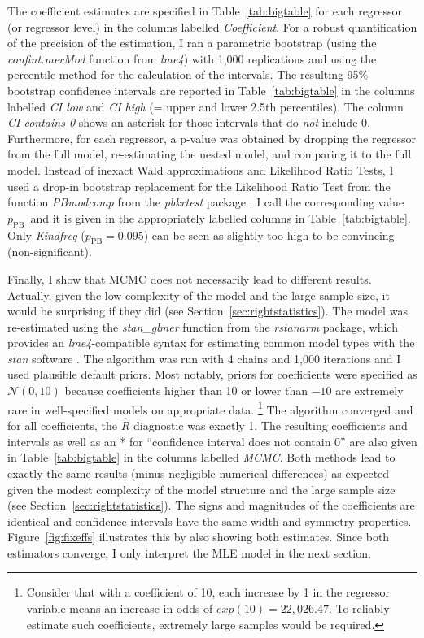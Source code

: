 \documentclass[USenglish]{article}
\newcommand{\mpPB}{\ensuremath{p_{\text{PB}}}}
\begin{document}
The coefficient estimates are specified in Table~\ref{tab:bigtable} for each regressor (or regressor level) in the columns labelled \textit{Coefficient}.
For a robust quantification of the precision of the estimation, I ran a parametric bootstrap (using the \mbox{\textit{confint.merMod}} function from \textit{lme4}) with 1,000 replications and using the percentile method for the calculation of the intervals.
The resulting 95\% bootstrap confidence intervals are reported in Table~\ref{tab:bigtable} in the columns labelled \textit{CI low} and \textit{CI high} (= upper and lower 2.5th percentiles).
The column \textit{CI contains 0} shows an asterisk for those intervals that do \textit{not} include 0.
Furthermore, for each regressor, a p-value was obtained by dropping the regressor from the full model, re-estimating the nested model, and comparing it to the full model.
Instead of inexact Wald approximations and Likelihood Ratio Tests, I used a drop-in bootstrap replacement for the Likelihood Ratio Test from the function \textit{PBmodcomp} from the \textit{pbkrtest} package \citep{HalekohHojsgaard2014}.
I call the corresponding value $p_{\text{PB}}$\ and it is given in the appropriately labelled columns in Table~\ref{tab:bigtable}.
Only \textit{Kindfreq} ($\mpPB=0.095$) can be seen as slightly too high to be convincing (non-significant).

Finally, I show that MCMC does not necessarily lead to different results.
Actually, given the low complexity of the model and the large sample size, it would be surprising if they did (see Section~\ref{sec:rightstatistics}).
The model was re-estimated using the \textit{stan\_glmer} function from the \textit{rstanarm} package, which provides an \textit{lme4}-compatible syntax for estimating common model types with the \textit{stan} software \citep{CarpenterEa2017}.
The algorithm was run with 4 chains and 1,000 iterations and I used plausible default priors.
Most notably, priors for coefficients were specified as $\mathcal{N}(0,10)$ because coefficients higher than 10 or lower than $-10$ are extremely rare in well-specified models on appropriate data.%
\footnote{Consider that with a coefficient of 10, each increase by 1 in the regressor variable means an increase in odds of $exp(10)=22,026.47$.
To reliably estimate such coefficients, extremely large samples would be required.}
The algorithm converged and for all coefficients, the $\hat{R}$ diagnostic was exactly 1.
The resulting coefficients and intervals as well as an * for ``confidence interval does not contain 0'' are also given in Table~\ref{tab:bigtable} in the columns labelled \textit{MCMC}.
Both methods lead to exactly the same results (minus negligible numerical differences) as expected given the modest complexity of the model structure and the large sample size (see Section~\ref{sec:rightstatistics}).
The signs and magnitudes of the coefficients are identical and confidence intervals have the same width and symmetry properties.
Figure~\ref{fig:fixeffs} illustrates this by also showing both estimates.
Since both estimators converge, I only interpret the MLE model in the next section.
\end{document}
